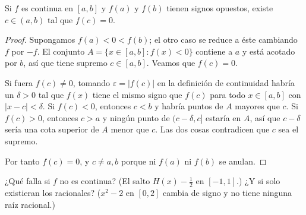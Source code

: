 %

\begin{frame}

\begin{theorem}[Bolzano]
Si $f$ es continua en $[a, b]$ y $f(a)$ y $f(b)$ tienen signos opuestos,
existe $c \in (a, b)$ tal que $f(c) = 0$.
\end{theorem}


\begin{notesonly}
\begin{proof}
Supongamos $f(a) < 0 < f(b)$; el otro caso se reduce a éste cambiando $f$ por
$-f$. El conjunto $A = \{x \in [a, b] : f(x) < 0\}$ contiene a $a$ y está
acotado por $b$, así que tiene supremo $c \in [a, b]$. Veamos que $f(c) = 0$.

Si fuera $f(c) \neq 0$, tomando $\varepsilon = |f(c)|$ en la definición de
continuidad habría un $\delta > 0$ tal que $f(x)$ tiene el mismo signo que
$f(c)$ para todo $x \in [a, b]$ con $|x - c| < \delta$. Si $f(c) < 0$,
entonces $c < b$ y habría puntos de $A$ mayores que $c$. Si $f(c) > 0$,
entonces $c > a$ y ningún punto de $(c - \delta, c]$ estaría en $A$, así que
$c - \delta$ sería una cota superior de $A$ menor que $c$. Las dos cosas
contradicen que $c$ sea el supremo.

Por tanto $f(c) = 0$, y $c \neq a, b$ porque ni $f(a)$ ni $f(b)$ se anulan.
\end{proof}
\end{notesonly}

\begin{teaching}
¿Qué falla si $f$ no es continua? (El salto $H(x) - \tfrac12$ en $[-1, 1]$.)
¿Y si solo
existieran los racionales? ($x^2 - 2$ en $[0, 2]$ cambia de signo y no tiene
ninguna raíz racional.)
\end{teaching}
\end{frame}

